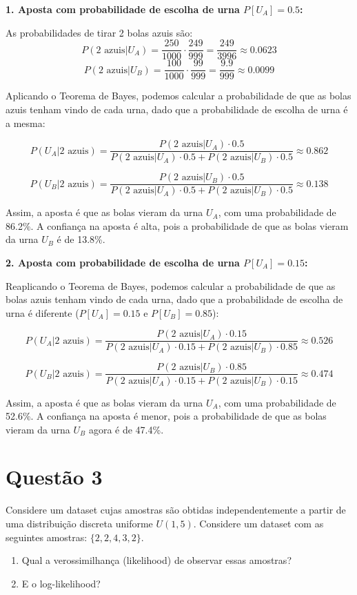 \documentclass[12 pt]{article}
\begin{document}
\begin{tcolorbox}[colback=white, colframe=black, title=Resposta:]

\textbf{1. Aposta com probabilidade de escolha de urna \(P[U_A] = 0.5 \):}

As probabilidades de tirar 2 bolas azuis são:
\[
P(2 \text{ azuis} | U_A) = \frac{250}{1000} \cdot \frac{249}{999} = \frac{249}{3996} \approx 0.0623
\]
\[
P(2 \text{ azuis} | U_B) = \frac{100}{1000} \cdot \frac{99}{999} = \frac{9.9}{999} \approx 0.0099
\]

Aplicando o Teorema de Bayes, podemos calcular a probabilidade de que as bolas azuis tenham vindo de cada urna, dado que a probabilidade de escolha de urna é a mesma:

\[
P(U_A | 2 \text{ azuis}) = \frac{P(2 \text{ azuis} | U_A) \cdot 0.5}{P(2 \text{ azuis} | U_A) \cdot 0.5 + P(2 \text{ azuis} | U_B) \cdot 0.5} \approx 0.862
\]

\[
P(U_B | 2 \text{ azuis}) = \frac{P(2 \text{ azuis} | U_B) \cdot 0.5}{P(2 \text{ azuis} | U_A) \cdot 0.5 + P(2 \text{ azuis} | U_B) \cdot 0.5} \approx 0.138
\]

Assim, a aposta é que as bolas vieram da urna \( U_A \), com uma probabilidade de 86.2\%. A confiança na aposta é alta, pois a probabilidade de que as bolas vieram da urna \( U_B \) é de 13.8\%.

\textbf{2. Aposta com probabilidade de escolha de urna \(P[U_A] = 0.15 \):}

Reaplicando o Teorema de Bayes, podemos calcular a probabilidade de que as bolas azuis tenham vindo de cada urna, dado que a probabilidade de escolha de urna é diferente (\(P[U_A] = 0.15 \) e \(P[U_B] = 0.85 \)):

\[
P(U_A | 2 \text{ azuis}) = \frac{P(2 \text{ azuis} | U_A) \cdot 0.15}{P(2 \text{ azuis} | U_A) \cdot 0.15 + P(2 \text{ azuis} | U_B) \cdot 0.85} \approx 0.526
\]

\[
P(U_B | 2 \text{ azuis}) = \frac{P(2 \text{ azuis} | U_B) \cdot 0.85}{P(2 \text{ azuis} | U_A) \cdot 0.15 + P(2 \text{ azuis} | U_B) \cdot 0.15} \approx 0.474
\]

Assim, a aposta é que as bolas vieram da urna \( U_A \), com uma probabilidade de 52.6\%. A confiança na aposta é menor, pois a probabilidade de que as bolas vieram da urna \( U_B \) agora é de 47.4\%.

\end{tcolorbox}
\newpage
\section*{Questão 3}
Considere um dataset cujas amostras são obtidas independentemente a partir de uma distribuição discreta uniforme $U(1, 5)$. Considere um dataset com as seguintes amostras: $\{2, 2, 4, 3, 2\}$.
\begin{enumerate}
    \item Qual a verossimilhança (likelihood) de observar essas amostras?
    \item E o log-likelihood?
\end{enumerate}
\end{document}
